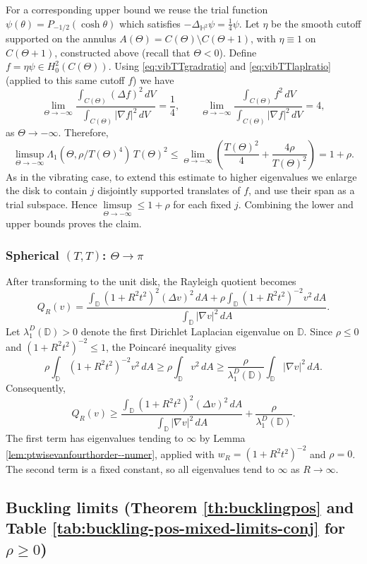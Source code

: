 \documentclass[11pt]{amsart}
\theoremstyle{definition}
\numberwithin{equation}{section}
\newcommand{\lapl}{\Delta}
\newcommand{\grad}{\nabla}
\renewcommand{\H}{\mathbb{H}}
\newcommand{\D}{\mathbb{D}}
\begin{document}
For a corresponding upper bound we reuse the trial function $\psi(\theta)=P_{-1/2}(\cosh\theta)$ which satisfies $-\lapl_{\H^2}\psi=\frac14\psi$. Let $\eta$ be the smooth cutoff supported on the annulus $A(\Theta)=C(\Theta)\setminus C(\Theta+1)$, with $\eta\equiv 1$ on $C(\Theta+1)$, constructed above (recall that $\Theta<0$). Define $f=\eta\psi\in H_0^2(C(\Theta))$.
Using \eqref{eq:vibTTgradratio} and \eqref{eq:vibTTlaplratio} (applied to this same cutoff $f$) we have
\[
\lim_{\Theta \to -\infty} \frac{\int_{C(\Theta)}(\lapl f)^2\,dV}{\int_{C(\Theta)}|\grad f|^2\,dV} = \frac14,
\qquad
\lim_{\Theta \to -\infty}\frac{\int_{C(\Theta)}f^2\,dV}{\int_{C(\Theta)}|\grad f|^2\,dV}=4,
\]
as $\Theta\to-\infty$. Therefore,
\[
\limsup_{\Theta\to-\infty}\Lambda_1(\Theta,\rho/T(\Theta)^4)\,T(\Theta)^2
\le \lim_{\Theta\to-\infty}\left(\frac{T(\Theta)^2}{4}+\frac{4\rho}{T(\Theta)^2}\right)=1+\rho.
\]
As in the vibrating case, to extend this estimate to higher eigenvalues we enlarge the disk to contain $j$ disjointly supported translates of $f$, and use their span as a trial subspace. Hence $\limsup\limits_{\Theta \to -\infty} \le 1+\rho$ for each fixed $j$. Combining the lower and upper bounds proves the claim.

\subsubsection*{Spherical $(T,T)$: $\Theta \to \pi$}

After transforming to the unit disk, the Rayleigh quotient becomes
\[
Q_R(v)=
\frac{\displaystyle
\int_{\D}(1+R^2t^2)^2(\lapl v)^2\,dA
+\rho\int_{\D}(1+R^2t^2)^{-2}v^2\,dA}
{\displaystyle\int_{\D}|\grad v|^2\,dA}.
\]
Let $\lambda_1^D(\D)>0$ denote the first Dirichlet Laplacian eigenvalue on $\D$. Since $\rho\leq0$ and $(1+R^2t^2)^{-2}\leq1$, the Poincar\'e inequality gives
\[
\rho\int_{\D}(1+R^2t^2)^{-2}v^2\,dA
\geq \rho\int_{\D}v^2\,dA
\geq \frac{\rho}{\lambda_1^D(\D)}
\int_{\D}|\grad v|^2\,dA.
\]
Consequently,
\[
Q_R(v)\geq
\frac{\displaystyle\int_{\D}(1+R^2t^2)^2(\lapl v)^2\,dA}
{\displaystyle\int_{\D}|\grad v|^2\,dA}
+\frac{\rho}{\lambda_1^D(\D)}.
\]
The first term has eigenvalues tending to $\infty$ by Lemma \ref{lem:ptwisevanfourthorder--numer}, applied with $w_R=(1+R^2t^2)^{-2}$ and $\rho=0$. The second term is a fixed constant, so all eigenvalues tend to $\infty$ as $R\to\infty$.

\subsection*{Buckling limits (Theorem \ref{th:bucklingpos} and Table \ref{tab:buckling-pos-mixed-limits-conj} for $\rho \geq 0$)}
\end{document}

